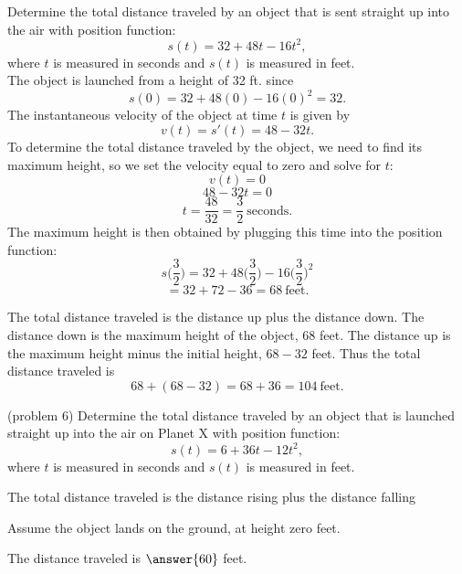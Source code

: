 \documentclass[handout]{ximera}
\begin{document}
 
\begin{example}[example 6]
Determine the total distance traveled by
an object that is sent straight up into the air with position function:
\[s(t) = 32 + 48t - 16t^2,\]
where $t$ is measured in seconds and $s(t)$ is measured in feet. \\
The object is launched from a height of 32 ft. since 
\[s(0) = 32 + 48(0) - 16(0)^2 = 32.\]
The instantaneous velocity of the object at time $t$ is given by
\[v(t) = s'(t) = 48-32t.\]
To determine the total distance traveled by the object, we need to find its maximum height, so
we set the velocity equal to zero and solve for $t$:
\[v(t) = 0  \] 
\[48-32t = 0\]
\[t = \frac{48}{32} = \frac{3}{2} \ \text{seconds}.\]
The maximum height is then obtained by plugging this time into the position function:
\[s\Big(\frac{3}{2}\Big) = 32 + 48\Big(\frac{3}{2}\Big) - 16\Big(\frac{3}{2}\Big)^2 \]
\[= 32 + 72 - 36 = 68 \  \text{feet}. \]

The total distance traveled is the distance up plus the distance down.  The distance down is the maximum height of the object,
$68$ feet.  The distance up is the maximum height minus the initial height, $68 - 32$ feet.
Thus the total distance traveled is  
\[68 + (68 - 32) = 68 + 36 = 104 \ \text{feet}.\]
\end{example}



\begin{problem}(problem 6)
Determine the total distance traveled by an object that is launched straight up into the air on Planet X with position function:
\[s(t) = 6 + 36t - 12t^2,\]
where $t$ is measured in seconds and $s(t)$ is measured in feet. 

\begin{hint}
The total distance traveled is the distance rising plus the distance falling
\end{hint}
\begin{hint}
Assume the object lands on the ground, at height zero feet.
\end{hint}

The distance traveled is $\answer{60}$ feet.

\end{problem}
\end{document}
